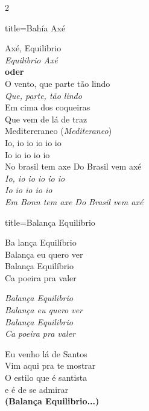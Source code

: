 \documentclass[fontsize=14pt, paper=a4, twoside, DIV=20]{scrreprt} %
\begin{document}
\begin{multicols*}{2}
\begin{song}{title={Bahía Axé}}
\begin{verse*}
        Axé, Equilibrio \\
        \textit{Equilibrio Axé} \\
        \textbf{oder} \\
        O vento, que parte tão lindo\\
        \textit{Que, parte, tão lindo}\\
        Em cima dos coqueiras\\
        Que vem de lá de traz\\
        Meditereraneo (\textit{Mediteraneo})\\
        Io, io io io io io\\
        Io io io io io\\
        No brasil tem axe Do Brasil vem axé\\
        \textit{Io, io io io io io}\\
        \textit{Io io io io io}\\
        \textit{Em Bonn tem axe Do Brasil vem axé}\\

    \end{verse*}
\end{song}


\begin{song}{title={Balança Equilíbrio}}
    \begin{verse*}
        Ba lança Equilíbrio\\
        Balança eu quero ver\\
        Balança Equilíbrio\\
        Ca poeira pra valer\\

        \begin{chorus*}
        \textit{Balança Equilibrio}\\
        \textit{Balança eu quero ver}\\
        \textit{Balança Equilibrio}\\
        \textit{Ca} \textit{poeira pra valer}\\
        \end{chorus*}

        Eu venho lá de Santos\\
        Vim aqui pra te mostrar\\
        O estilo que é santista\\
        e é de se admirar\\
        \textbf{(Balança Equilibrio...)}\\


\end{verse*}
\end{song}
\end{multicols*}
\end{document}
